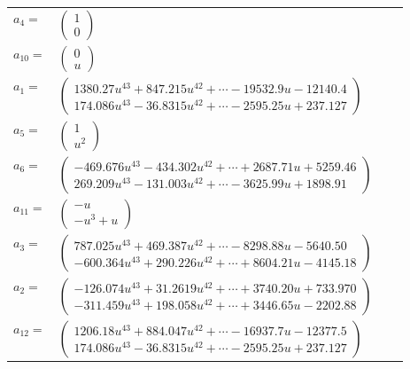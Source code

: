 \documentclass[1p]{elsarticle_modified}
\theoremstyle{definition}
\begin{document}
\begin{tabular}{m{7pt} m{180pt} m{7pt} m{180pt} }
\flushright $a_{4}=$&$\begin{pmatrix}1\\0\end{pmatrix}$ \\
\flushright $a_{10}=$&$\begin{pmatrix}0\\u\end{pmatrix}$ \\
\flushright $a_{1}=$&$\begin{pmatrix}1380.27 u^{43}+847.215 u^{42}+\cdots-19532.9 u-12140.4\\174.086 u^{43}-36.8315 u^{42}+\cdots-2595.25 u+237.127\end{pmatrix}$ \\
\flushright $a_{5}=$&$\begin{pmatrix}1\\u^2\end{pmatrix}$ \\
\flushright $a_{6}=$&$\begin{pmatrix}-469.676 u^{43}-434.302 u^{42}+\cdots+2687.71 u+5259.46\\269.209 u^{43}-131.003 u^{42}+\cdots-3625.99 u+1898.91\end{pmatrix}$ \\
\flushright $a_{11}=$&$\begin{pmatrix}- u\\- u^3+u\end{pmatrix}$ \\
\flushright $a_{3}=$&$\begin{pmatrix}787.025 u^{43}+469.387 u^{42}+\cdots-8298.88 u-5640.50\\-600.364 u^{43}+290.226 u^{42}+\cdots+8604.21 u-4145.18\end{pmatrix}$ \\
\flushright $a_{2}=$&$\begin{pmatrix}-126.074 u^{43}+31.2619 u^{42}+\cdots+3740.20 u+733.970\\-311.459 u^{43}+198.058 u^{42}+\cdots+3446.65 u-2202.88\end{pmatrix}$ \\
\flushright $a_{12}=$&$\begin{pmatrix}1206.18 u^{43}+884.047 u^{42}+\cdots-16937.7 u-12377.5\\174.086 u^{43}-36.8315 u^{42}+\cdots-2595.25 u+237.127\end{pmatrix}$ \\

\end{tabular}
\end{document}
